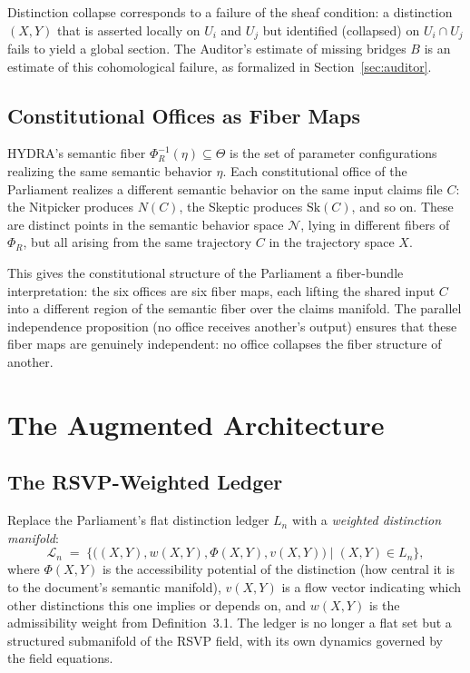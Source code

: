 \documentclass[12pt, a4paper]{article}
\theoremstyle{plain}
\theoremstyle{definition}
\theoremstyle{remark}
\begin{document}
Distinction collapse corresponds to a failure of the sheaf condition: a distinction $(X,Y)$ that is asserted locally on $U_i$ and $U_j$ but identified (collapsed) on $U_i \cap U_j$ fails to yield a global section. The Auditor's estimate of missing bridges $B$ is an estimate of this cohomological failure, as formalized in Section~\ref{sec:auditor}.

\subsection{Constitutional Offices as Fiber Maps}

HYDRA's semantic fiber $\Phi_R^{-1}(\eta) \subseteq \Theta$ is the set of parameter configurations realizing the same semantic behavior $\eta$. Each constitutional office of the Parliament realizes a different semantic behavior on the same input claims file $C$: the Nitpicker produces $N(C)$, the Skeptic produces $\mathrm{Sk}(C)$, and so on. These are distinct points in the semantic behavior space $\mathcal{N}$, lying in different fibers of $\Phi_R$, but all arising from the same trajectory $C$ in the trajectory space $X$.

This gives the constitutional structure of the Parliament a fiber-bundle interpretation: the six offices are six fiber maps, each lifting the shared input $C$ into a different region of the semantic fiber over the claims manifold. The parallel independence proposition (no office receives another's output) ensures that these fiber maps are genuinely independent: no office collapses the fiber structure of another.

\section{The Augmented Architecture}
\label{sec:architecture}

\subsection{The RSVP-Weighted Ledger}

Replace the Parliament's flat distinction ledger $L_n$ with a \emph{weighted distinction manifold}:
\[
\mathcal{L}_n \;=\; \bigl\{ \bigl((X,Y), w(X,Y), \Phi(X,Y), v(X,Y)\bigr) \mid (X,Y) \in L_n \bigr\},
\]
where $\Phi(X,Y)$ is the accessibility potential of the distinction (how central it is to the document's semantic manifold), $v(X,Y)$ is a flow vector indicating which other distinctions this one implies or depends on, and $w(X,Y)$ is the admissibility weight from Definition~3.1. The ledger is no longer a flat set but a structured submanifold of the RSVP field, with its own dynamics governed by the field equations.
\end{document}
